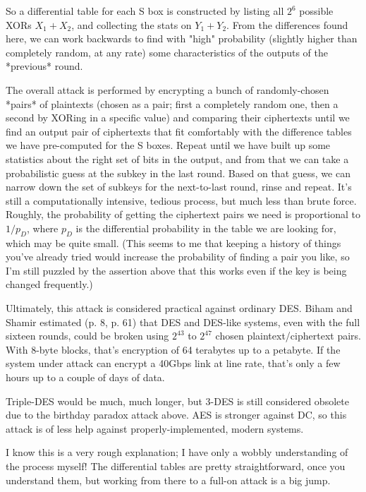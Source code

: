 \documentclass[%
 aip,
 jmp,%
 amsmath,amssymb,
 reprint,%
]{revtex4-1}
\begin{document}
So a differential table for each S box is constructed by listing all
$2^6$ possible XORs $X_1 + X_2$, and collecting the stats on $Y_1 +
Y_2$.  From the differences found here, we can work backwards to find
with "high" probability (slightly higher than completely random, at
any rate) some characteristics of the outputs of the *previous* round.

The overall attack is performed by encrypting a bunch of
randomly-chosen *pairs* of plaintexts (chosen as a pair; first a
completely random one, then a second by XORing in a specific value)
and comparing their ciphertexts until we find an output pair of
ciphertexts that fit comfortably with the difference tables we have
pre-computed for the S boxes.  Repeat until we have built up some
statistics about the right set of bits in the output, and from that we
can take a probabilistic guess at the subkey in the last round.  Based
on that guess, we can narrow down the set of subkeys for the
next-to-last round, rinse and repeat.  It's still a computationally
intensive, tedious process, but much less than brute force.  Roughly,
the probability of getting the ciphertext pairs we need is
proportional to $1/p_D$, where $p_D$ is the differential probability in
the table we are looking for, which may be quite small.
(This seems to me that keeping a history of things you've already
tried would increase the probability of finding a pair you like, so
I'm still puzzled by the assertion above that this works even if the
key is being changed frequently.)

Ultimately, this attack is considered practical against ordinary DES.
Biham and Shamir estimated (p. 8, p. 61) that DES and DES-like
systems, even with the full sixteen rounds, could be broken using
$2^{43}$ to $2^{47}$ chosen plaintext/ciphertext pairs.  With 8-byte
blocks, that's encryption of 64 terabytes up to a petabyte.  If the
system under attack can encrypt a 40Gbps link at line rate, that's
only a few hours up to a couple of days of data.

Triple-DES would be much, much longer, but 3-DES is still considered
obsolete due to the birthday paradox attack above.  AES is stronger
against DC, so this attack is of less help against
properly-implemented, modern systems.

I know this is a very rough explanation; I have only a wobbly
understanding of the process myself!  The differential tables are
pretty straightforward, once you understand them, but working from
there to a full-on attack is a big jump.
\end{document}
